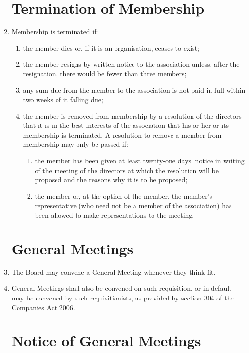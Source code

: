 \begin{enumerate}
\section{Termination of Membership}

\item
  Membership is terminated if:
  \begin{enumerate}
  \item
    the member dies or, if it is an organisation, ceases to exist;
  \item
    the member resigns by written notice to the association unless, after
    the resignation, there would be fewer than three members;
  \item
    any sum due from the member to the association is not paid in full
    within two weeks of it falling due;
  \item
    the member is removed from membership by a resolution of the
    directors that it is in the best interests of the association that his
    or her or its membership is terminated. A resolution to remove a
    member from membership may only be passed if:
    \begin{enumerate}
    \item
      the member has been given at least twenty-one days' notice in
      writing of the meeting of the directors at which the resolution
      will be proposed and the reasons why it is to be proposed;
    \item
      the member or, at the option of the member, the member's
      representative (who need not be a member of the association) has been
      allowed to make representations to the meeting.
    \end{enumerate}
  \end{enumerate}

\section{General Meetings}
\item
    The Board may convene a General Meeting whenever they think fit. 

\item 
    General Meetings shall also be convened on such requisition, or in default may be convened by such
    requisitionists, as provided by section 304 of the Companies Act 2006.

\section{Notice of General Meetings}


\end{enumerate}
